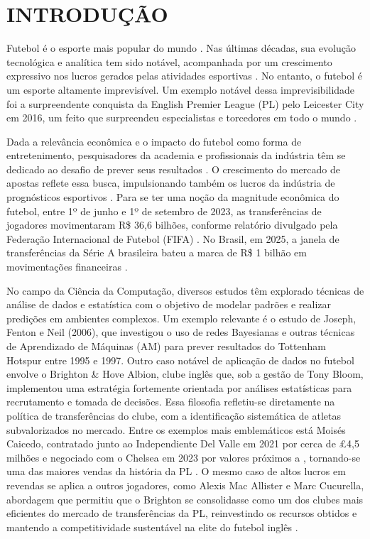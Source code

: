 \chapter{\MakeUppercase{Introdução}}

Futebol é o esporte mais popular do mundo \cite{Almulla2023}. Nas últimas décadas, sua evolução tecnológica e analítica tem sido notável, 
acompanhada por um crescimento expressivo nos lucros gerados pelas atividades esportivas \cite{Rodrigues2022}. 
No entanto, o futebol é um esporte altamente imprevisível. Um exemplo notável dessa imprevisibilidade foi a surpreendente conquista da 
English Premier League (PL) pelo Leicester City em 2016, um feito que surpreendeu especialistas e torcedores em todo o mundo \cite{Baboota2019}.

Dada a relevância econômica e o impacto do futebol como forma de entretenimento, pesquisadores da academia e profissionais da indústria têm se dedicado ao 
desafio de prever seus resultados \cite{Baboota2019}. O crescimento do mercado de apostas reflete essa busca, impulsionando também os lucros da indústria de 
prognósticos esportivos \cite{Rodrigues2022}. Para se ter uma noção da magnitude econômica do futebol, entre 1º de junho e 1º de setembro de 2023, as transferências 
de jogadores movimentaram R\$ 36,6 bilhões, conforme relatório divulgado pela Federação Internacional de Futebol (FIFA) \cite{Globo2023}. No Brasil, em 2025, 
a janela de transferências da Série A brasileira bateu a marca de R\$ 1 bilhão em movimentações financeiras \cite{Globo2025}.

No campo da Ciência da Computação, diversos estudos têm explorado técnicas de análise de dados e estatística com o objetivo de modelar padrões e realizar predições 
em ambientes complexos. Um exemplo relevante é o estudo de Joseph, Fenton e Neil (2006), que investigou o uso de redes Bayesianas e outras técnicas de Aprendizado 
de Máquinas (AM) para prever resultados do Tottenham Hotspur entre 1995 e 1997. Outro caso notável de aplicação de dados no futebol envolve o 
Brighton \& Hove Albion, clube inglês que, sob a gestão de Tony Bloom, implementou uma estratégia fortemente orientada por análises estatísticas para 
recrutamento e tomada de decisões. Essa filosofia refletiu-se diretamente na política de transferências do clube, 
com a identificação sistemática de atletas subvalorizados no mercado. Entre os exemplos mais emblemáticos está
Moisés Caicedo, contratado junto ao Independiente Del Valle em 2021 por cerca de \pounds4,5 milhões e negociado com o Chelsea em 2023 por valores próximos a 
, tornando-se uma das maiores vendas da história da PL \cite{BBC2023Caicedo, CNN2023Caicedo}. O mesmo caso de altos lucros em revendas se aplica 
a outros jogadores, como Alexis Mac Allister e Marc Cucurella, abordagem que permitiu que o Brighton se consolidasse como um dos clubes 
mais eficientes do mercado de transferências da PL, reinvestindo os recursos obtidos e mantendo a competitividade sustentável na elite do futebol inglês \cite{ESPN2023}.

